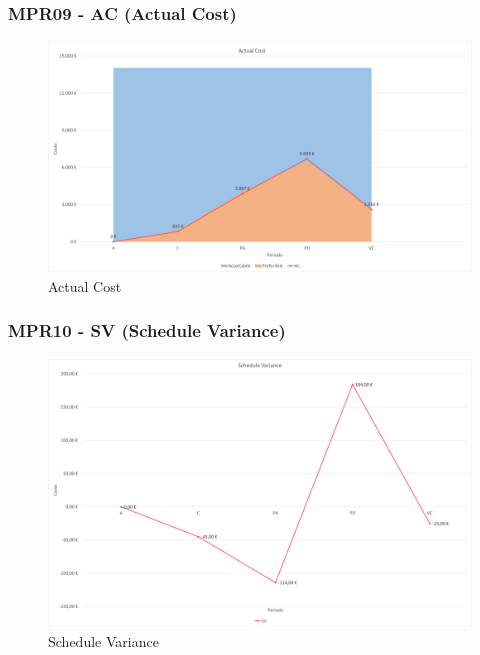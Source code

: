 \subsubsection{MPR09 - AC (Actual Cost)}
\begin{figure}[!ht]
    \caption{Actual Cost}
    \vspace{10px}
    \includegraphics[scale=0.5]{sezioni/immagini/ActualCost.png}
    \centering
\end{figure}
\pagebreak
\subsubsection{MPR10 - SV (Schedule Variance)}
\begin{figure}[!ht]
    \caption{Schedule Variance}
    \vspace{10px}
    \includegraphics[scale=0.5]{sezioni/immagini/ScheduleVariance.png}
    \centering
\end{figure}
